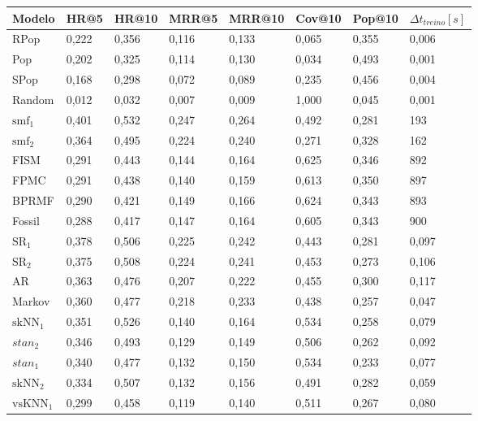 \begin{table}[htbp]
  \centering
  \begin{tabular}{|l|l|l|l|l|l|l|l|}
    \hline
    Modelo & HR@5 & HR@10 & MRR@5 & MRR@10 & Cov@10 & Pop@10 & $\Delta t_{treino} [s]$ \\
    \hline
    RPop & 0,222 & 0,356 & 0,116 & 0,133 & 0,065 & 0,355 & 0,006 \\
    \hline
    Pop & 0,202 & 0,325 & 0,114 & 0,130 & 0,034 & 0,493 & 0,001 \\
    \hline
    SPop & 0,168 & 0,298 & 0,072 & 0,089 & 0,235 & 0,456 & 0,004 \\
    \hline
    Random & 0,012 & 0,032 & 0,007 & 0,009 & 1,000 & 0,045 & 0,001 \\
    \hline
    \hline
    $\text{smf}_{1}$ & 0,401 & 0,532 & 0,247 & 0,264 & 0,492 & 0,281 & 193 \\
    \hline
    $\text{smf}_{2}$ & 0,364 & 0,495 & 0,224 & 0,240 & 0,271 & 0,328 & 162 \\
    \hline
    FISM & 0,291 & 0,443 & 0,144 & 0,164 & 0,625 & 0,346 & 892 \\
    \hline
    FPMC & 0,291 & 0,438 & 0,140 & 0,159 & 0,613 & 0,350 & 897 \\
    \hline
    BPRMF & 0,290 & 0,421 & 0,149 & 0,166 & 0,624 & 0,343 & 893 \\
    \hline
    Fossil & 0,288 & 0,417 & 0,147 & 0,164 & 0,605 & 0,343 & 900 \\
    \hline
    \hline
    $\text{SR}_{1}$ & 0,378 & 0,506 & 0,225 & 0,242 & 0,443 & 0,281 & 0,097 \\
    \hline
    $\text{SR}_{2}$ & 0,375 & 0,508 & 0,224 & 0,241 & 0,453 & 0,273 & 0,106 \\
    \hline
    AR & 0,363 & 0,476 & 0,207 & 0,222 & 0,455 & 0,300 & 0,117 \\
    \hline
    Markov & 0,360 & 0,477 & 0,218 & 0,233 & 0,438 & 0,257 & 0,047 \\
    \hline
    $\text{skNN}_{1}$ & 0,351 & 0,526 & 0,140 & 0,164 & 0,534 & 0,258 & 0,079 \\
    \hline
    $stan_{2}$ & 0,346 & 0,493 & 0,129 & 0,149 & 0,506 & 0,262 & 0,092 \\
    \hline
    $stan_{1}$ & 0,340 & 0,477 & 0,132 & 0,150 & 0,534 & 0,233 & 0,077 \\
    \hline
    $\text{skNN}_{2}$ & 0,334 & 0,507 & 0,132 & 0,156 & 0,491 & 0,282 & 0,059 \\
    \hline
    $\text{vsKNN}_{1}$ & 0,299 & 0,458 & 0,119 & 0,140 & 0,511 & 0,267 & 0,080 \\

\end{tabular}
\end{table}
